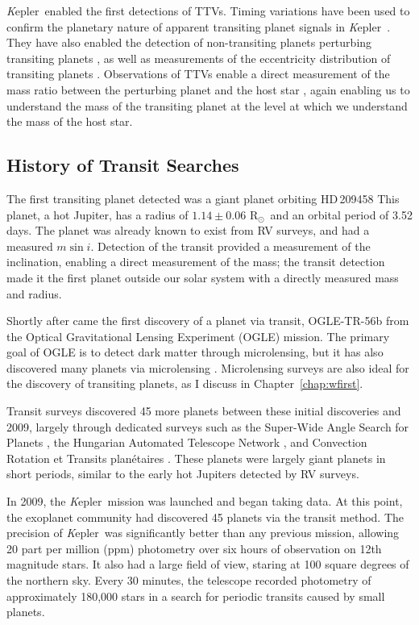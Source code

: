 \documentclass[12pt]{caltech_thesis}
\newcommand{\rsun}{{R$_\odot$}}
\newcommand{\kep}{{\textit Kepler}}
\begin{document}
\kep\ enabled the first detections of TTVs. 
Timing variations have been used to confirm the planetary nature of apparent transiting
planet signals in \kep\ \citep{Holman10, Rowe14}.
They have also enabled the detection of non-transiting planets perturbing transiting
planets \citep[e.g.][]{Ballard11, Nesvorny13}, as well as measurements of the eccentricity 
distribution of transiting planets \citep{Hadden14}.
Observations of TTVs enable a direct measurement of the mass ratio between the
perturbing planet and the host star \citep{Agol05, LithwickWu12},
again enabling us to understand the mass of the transiting planet at the level 
at which we understand the mass of the host star.
 


\subsection{History of Transit Searches}
The first transiting planet detected was a giant planet orbiting HD\,209458 
\citep{Charbonneau00, Henry00}
This planet, a hot Jupiter, has a radius of $1.14 \pm 0.06$ \rsun\ and an orbital 
period of 3.52 days.
The planet was already known to exist from RV surveys, and had a measured $m \sin i$.
Detection of the transit provided a measurement of the inclination, enabling a 
direct measurement of the mass; the transit detection made it the first planet outside our solar system with a directly measured mass and radius.

Shortly after came the first discovery of a planet via transit, OGLE-TR-56b \citep{Udalski02} from the Optical Gravitational Lensing Experiment (OGLE) mission.
The primary goal of OGLE is to detect dark matter through microlensing, but it has also discovered 
many planets via microlensing \citep{Sumi11, Cassan12}.
Microlensing surveys are also ideal for the discovery of transiting planets, as 
I discuss in Chapter~\ref{chap:wfirst}.

Transit surveys discovered 45 more planets between these initial discoveries and 2009, largely through dedicated surveys such as the Super-Wide Angle Search for Planets \citep[SuperWASP,][]{Street03}, the Hungarian Automated Telescope Network 
\citep[HATNet,][]{Bakos02}, and
Convection Rotation et Transits plan\'{e}taires \citep[CoRoT,][]{Auvergne09}.
These planets were largely giant planets in short periods, similar to the early hot Jupiters
detected by RV surveys. 

In 2009, the \kep\ mission \citep{Borucki10} was launched and began taking data.
At this point, the exoplanet community had discovered 45 planets via the transit
method.
The precision of \kep\ was significantly better than any previous mission, allowing
20 part per million (ppm) photometry over six hours of observation on 12th magnitude
stars. 
It also had a large field of view, staring at 100 square degrees of the northern sky.
Every 30 minutes, the telescope recorded photometry of approximately 180,000 stars in a
search for periodic transits caused by small planets.
\end{document}
